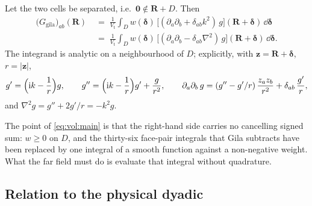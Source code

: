 \begin{theorem}
\label{thm:vol:main}
Let the two cells be separated, i.e.\ $\mathbf{0} \notin \mathbf{R}+D$. Then
\begin{equation}
\boxed{\;
\begin{aligned}
\bigl(G_{\mathrm{gila}}\bigr)_{ab}(\mathbf{R})
&\;=\; \frac{1}{V_{\mathrm{t}}}\int_{D} w(\boldsymbol{\delta})\,
\bigl[(\partial_a\partial_b + \delta_{ab}k^2)\,g\bigr]
(\mathbf{R}+\boldsymbol{\delta})\,\dd\boldsymbol{\delta}\\
&\;=\; \frac{1}{V_{\mathrm{t}}}\int_{D} w(\boldsymbol{\delta})\,
\bigl[(\partial_a\partial_b - \delta_{ab}\nabla^2)\,g\bigr]
(\mathbf{R}+\boldsymbol{\delta})\,\dd\boldsymbol{\delta} .
\end{aligned}\;}
\label{eq:vol:main}
\end{equation}
The integrand is analytic on a neighbourhood of $D$; explicitly, with
$\mathbf{z} = \mathbf{R}+\boldsymbol{\delta}$, $r = |\mathbf{z}|$,
\begin{equation}
g' = \Bigl(\mathrm{i} k - \frac{1}{r}\Bigr) g, \qquad
g'' = \Bigl(\mathrm{i} k - \frac{1}{r}\Bigr) g' + \frac{g}{r^2}, \qquad
\partial_a\partial_b\, g = (g'' - g'/r)\,\frac{z_a z_b}{r^2} + \delta_{ab}\,\frac{g'}{r},
\label{eq:vol:d2}
\end{equation}
and $\nabla^2 g = g'' + 2g'/r = -k^2 g$.
\end{theorem}

The point of \eqref{eq:vol:main} is that the right-hand side carries no cancelling signed
sum: $w \ge 0$ on $D$, and the thirty-six face-pair integrals that Gila subtracts have
been replaced by one integral of a smooth function against a non-negative weight. What
the far field must do is evaluate that integral without quadrature.

\subsection{Relation to the physical dyadic}
\label{sec:vol:phys}

